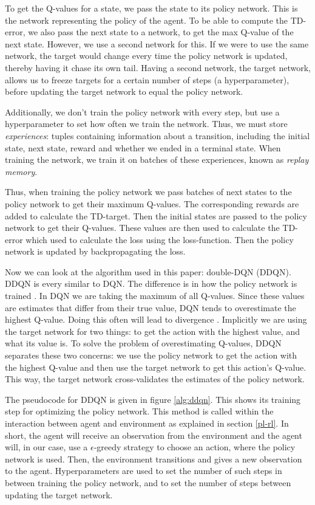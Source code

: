To get the Q-values for a state, we pass the state to its policy network. This is the network representing the policy of the agent. To be able to compute the TD-error, we also pass the next state to a network, to get the max Q-value of the next state. However, we use a second network for this. If we were to use the same network, the target would change every time the policy network is updated, thereby having it chase its own tail. Having a second network, the target network, allows us to freeze targets for a certain number of steps (a hyperparameter), before updating the target network to equal the policy network.

Additionally, we don't train the policy network with every step, but use a hyperparameter to set how often we train the network. Thus, we must store \emph{experiences}: tuples containing information about a transition, including the initial state, next state, reward and whether we ended in a terminal state. When training the network, we train it on batches of these experiences, known as \emph{replay memory}. 

Thus, when training the policy network we pass batches of next states to the policy network to get their maximum Q-values. The corresponding rewards are added to calculate the TD-target. Then the initial states are passed to the policy network to get their Q-values. These values are then used to calculate the TD-error which used to calculate the loss using the loss-function. Then the policy network is updated by backpropagating the loss.

Now we can look at the algorithm used in this paper: double-DQN (DDQN). DDQN is every similar to DQN. The difference is in how the policy network is trained \cite{ddqn}. In DQN we are taking the maximum of all Q-values. Since these values are estimates that differ from their true value, DQN tends to overestimate the highest Q-value. Doing this often will lead to divergence \cite[p. 293-297]{grokking}. Implicitly we are using the target network for two things: to get the action with the highest value, and what its value is. To solve the problem of overestimating Q-values, DDQN separates these two concerns: we use the policy network to get the action with the highest Q-value and then use the target network to get this action's Q-value. This way, the target network cross-validates the estimates of the policy network.

The pseudocode for DDQN is given in figure \ref{alg:ddqn}. This shows its training step for optimizing the policy network. This method is called within the interaction between agent and environment as explained in section \ref{pl-rl}. In short, the agent will receive an observation from the environment and the agent will, in our case, use a {$\epsilon$}-greedy strategy to choose an action, where the policy network is used. Then, the environment transitions and gives a new observation to the agent. Hyperparameters are used to set the number of such steps in between training the policy network, and to set the number of steps between updating the target network.

